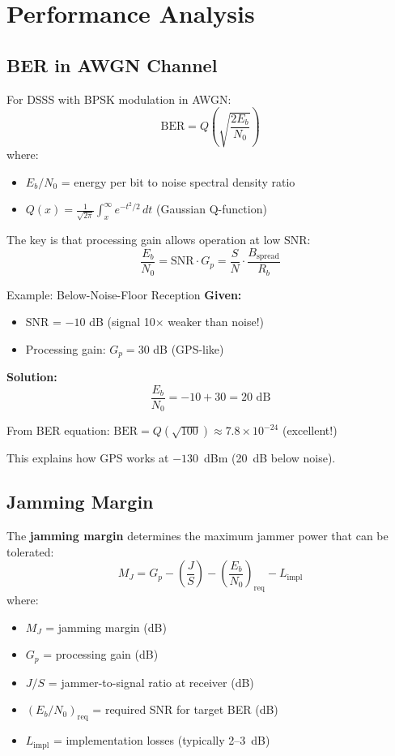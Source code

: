 \section{Performance Analysis}

\subsection{BER in AWGN Channel}

For DSSS with BPSK modulation in AWGN:
\begin{equation}
\mathrm{BER} = Q\left(\sqrt{\frac{2E_b}{N_0}}\right)
\end{equation}
where:
\begin{itemize}
\item $E_b/N_0$ = energy per bit to noise spectral density ratio
\item $Q(x) = \frac{1}{\sqrt{2\pi}}\int_x^\infty e^{-t^2/2}\, dt$ (Gaussian Q-function)
\end{itemize}

The key is that processing gain allows operation at low SNR:
\begin{equation}
\frac{E_b}{N_0} = \mathrm{SNR} \cdot G_p = \frac{S}{N} \cdot \frac{B_{\mathrm{spread}}}{R_b}
\end{equation}

\begin{calloutbox}{Example: Below-Noise-Floor Reception}
\textbf{Given:}
\begin{itemize}
\item SNR = $-10$ dB (signal 10$\times$ weaker than noise!)
\item Processing gain: $G_p = 30$ dB (GPS-like)
\end{itemize}

\textbf{Solution:}
$$\frac{E_b}{N_0} = -10 + 30 = 20\text{ dB}$$

From BER equation: $\mathrm{BER} = Q(\sqrt{100}) \approx 7.8 \times 10^{-24}$ (excellent!)

This explains how GPS works at $-130$~dBm (20~dB below noise).
\end{calloutbox}

\subsection{Jamming Margin}

The \textbf{jamming margin} determines the maximum jammer power that can be tolerated:
\begin{equation}
M_J = G_p - \left(\frac{J}{S}\right) - \left(\frac{E_b}{N_0}\right)_{\mathrm{req}} - L_{\mathrm{impl}}
\end{equation}
where:
\begin{itemize}
\item $M_J$ = jamming margin (dB)
\item $G_p$ = processing gain (dB)
\item $J/S$ = jammer-to-signal ratio at receiver (dB)
\item $(E_b/N_0)_{\mathrm{req}}$ = required SNR for target BER (dB)
\item $L_{\mathrm{impl}}$ = implementation losses (typically 2--3~dB)
\end{itemize}


